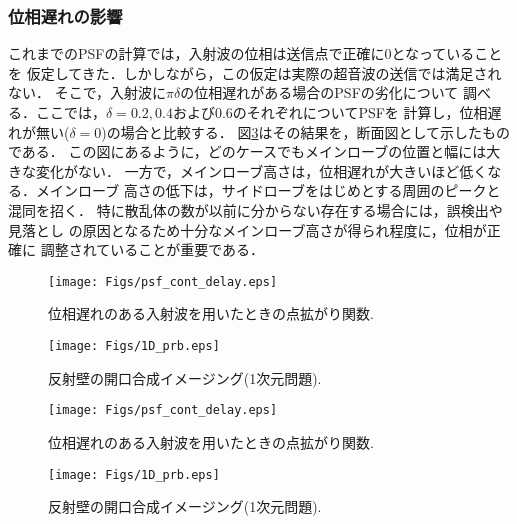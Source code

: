 \subsubsection{位相遅れの影響}
これまでのPSFの計算では，入射波の位相は送信点で正確に0となっていることを
仮定してきた．しかしながら，この仮定は実際の超音波の送信では満足されない．
そこで，入射波に$\pi \delta$の位相遅れがある場合のPSFの劣化について
調べる．ここでは，$\delta=0.2,0.4$および$0.6$のそれぞれについてPSFを
計算し，位相遅れが無い($\delta =0$)の場合と比較する．
図\ref{fig:XXX_psf_cont_delay}はその結果を，断面図として示したものである．
この図にあるように，どのケースでもメインローブの位置と幅には大きな変化がない．
一方で，メインローブ高さは，位相遅れが大きいほど低くなる．メインローブ
高さの低下は，サイドローブをはじめとする周囲のピークと混同を招く．
特に散乱体の数が以前に分からない存在する場合には，誤検出や見落とし
の原因となるため十分なメインローブ高さが得られ程度に，位相が正確に
調整されていることが重要である．
\begin{figure}[h]
	\begin{center}
	\texttt{[image: Figs/psf\_cont\_delay.eps]} 
	\end{center}
	\caption{位相遅れのある入射波を用いたときの点拡がり関数.} 
	\label{fig:XXX_psf_cont_delay}
\end{figure}
\begin{figure}[h]
	\begin{center}
	\texttt{[image: Figs/1D\_prb.eps]} 
	\end{center}
	\caption{反射壁の開口合成イメージング(1次元問題).} 
	\label{fig:XXX_1D_prb}
\end{figure}
\begin{figure}[h]
	\begin{center}
	\texttt{[image: Figs/psf\_cont\_delay.eps]} 
	\end{center}
	\caption{位相遅れのある入射波を用いたときの点拡がり関数.} 
	\label{fig:XXX_psf_cont_delay}
\end{figure}
\begin{figure}[h]
	\begin{center}
	\texttt{[image: Figs/1D\_prb.eps]} 
	\end{center}
	\caption{反射壁の開口合成イメージング(1次元問題).} 
	\label{fig:XXX_1D_prb}
\end{figure}
